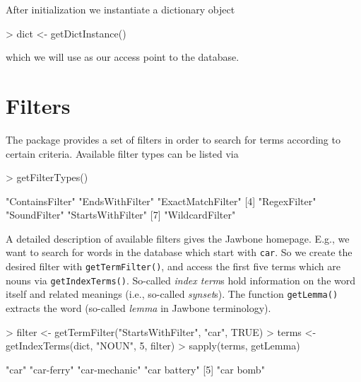 \documentclass[a4paper]{article}
\newcommand{\code}[1]{\mbox{\texttt{#1}}}
\newcommand{\proglang}[1]{\textsf{#1}}
\begin{document}
After initialization we instantiate a dictionary object
\begin{Schunk}
\begin{Sinput}
> dict <- getDictInstance()
\end{Sinput}
\end{Schunk}
which we will use as our access point to the database.

\section*{Filters}
The package provides a set of filters in order to search for terms
according to certain criteria. Available filter types can be listed via
\begin{Schunk}
\begin{Sinput}
> getFilterTypes()
\end{Sinput}
\begin{Soutput}
[1] "ContainsFilter"   "EndsWithFilter"   "ExactMatchFilter"
[4] "RegexFilter"      "SoundFilter"      "StartsWithFilter"
[7] "WildcardFilter"  
\end{Soutput}
\end{Schunk}
A detailed description of available
filters gives the \proglang{Jawbone} homepage. E.g., we want to search
for words in the database which start with \code{car}. So we create
the desired filter with \code{getTermFilter()}, and access the first
five terms which are nouns via \code{getIndexTerms()}. So-called \emph{index
term}s hold information on the word itself and related meanings (i.e.,
so-called \emph{synset}s). The function \code{getLemma()} extracts the
word (so-called \emph{lemma} in \proglang{Jawbone} terminology).
\begin{Schunk}
\begin{Sinput}
> filter <- getTermFilter("StartsWithFilter", "car", TRUE)
> terms <- getIndexTerms(dict, "NOUN", 5, filter)
> sapply(terms, getLemma)
\end{Sinput}
\begin{Soutput}
[1] "car"          "car-ferry"    "car-mechanic" "car battery" 
[5] "car bomb"    
\end{Soutput}
\end{Schunk}
\end{document}
